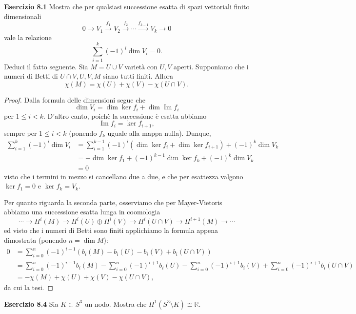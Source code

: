 \documentclass[a4paper]{article}
\newcommand{\R}{\mathbb{R}}
\renewcommand{\Im}{\operatorname{Im}}
\theoremstyle{definition}
\theoremstyle{definition}
\theoremstyle{remark}
\theoremstyle{definition}
\begin{document}
\textbf{Esercizio 8.1}
Mostra che per qualsiasi successione esatta di spazi vettoriali finito dimensionali
\[
    0 \to V_1 \overset{f_1}{\to} V_2 \overset{f_2}{\to} \cdots \overset{f_{k-1}}{\to} V_k \to 0
\]
vale la relazione
\[
    \sum_{i=1}^k (-1)^i \dim V_i = 0.
\]
Deduci il fatto seguente. Sia $M = U \cup V$ varietà con $U, V$ aperti. Supponiamo che i numeri di Betti di $U \cap V, U, V, M$ siano tutti finiti. Allora
\[
    \chi(M) = \chi(U) + \chi(V) - \chi(U \cap V).
\]
\begin{proof}
    Dalla formula delle dimensioni segue che $$\dim V_i = \dim \ker f_i + \dim \Im f_{i}$$ per $1\leq i<k$. D'altro canto, poichè la successione è esatta abbiamo $$\Im f_{i} = \ker
        f_{i+1},$$
    sempre per $1\leq i<k$ (ponendo $f_k$ uguale alla mappa nulla). Dunque,
    \[
        \begin{aligned}
            \sum_{i=1}^k (-1)^i \dim V_i & = \sum_{i=1}^{k-1} (-1)^i (\dim \ker f_i + \dim \ker f_{i+1}) + (-1)^k \dim V_k \\
                                         & = -\dim \ker f_1 + (-1)^{k-1} \dim \ker f_k + (-1)^k \dim V_k                   \\
                                         & = 0
        \end{aligned}
    \]
    visto che i termini in mezzo si cancellano due a due, e che per esattezza valgono $\ker f_1 = 0$ e $\ker f_k = V_k$.

    Per quanto riguarda la seconda parte, osserviamo che per Mayer-Vietoris abbiamo una successione esatta lunga in coomologia
    \[
        \cdots \to H^i(M) \to H^i(U) \oplus H^i(V) \to H^i(U \cap V) \to H^{i+1}(M) \to \cdots
    \]
    ed visto che i numeri di Betti sono finiti applichiamo la formula appena dimostrata (ponendo $n = \dim M$):
    \[
        \begin{aligned}
            0 & = \sum_{i=0}^{n} (-1)^{i+1} \left(b_i(M) - b_i(U) - b_i(V) + b_i(U \cap V)\right)                                                                  \\
              & = \sum_{i=0}^{n} (-1)^{i+1} b_i(M) - \sum_{i=0}^{n} (-1)^{i+1} b_i(U) - \sum_{i=0}^{n} (-1)^{i+1} b_i(V) + \sum_{i=0}^{n} (-1)^{i+1} b_i(U \cap V) \\
              & = -\chi(M) + \chi(U) + \chi(V) - \chi(U \cap V),
        \end{aligned}
    \]
    da cui la tesi.
\end{proof}
\textbf{Esercizio 8.4}
Sia $K \subset S^3$ un nodo. Mostra che $H^1(S^3 \setminus K) \cong \R$.
\end{document}
